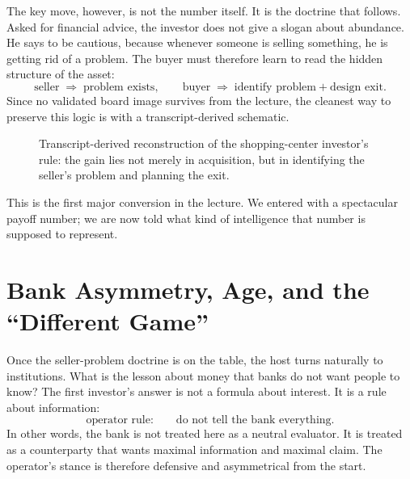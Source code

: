 The key move, however, is not the number itself. It is the doctrine that follows. Asked for financial advice, the investor does not give a slogan about abundance. He says to be cautious, because whenever someone is selling something, he is getting rid of a problem. The buyer must therefore learn to read the hidden structure of the asset:
\begin{equation}
\text{seller} \;\Rightarrow\; \text{problem exists},\qquad
\text{buyer} \;\Rightarrow\; \text{identify problem} + \text{design exit}.
\end{equation}
Since no validated board image survives from the lecture, the cleanest way to preserve this logic is with a transcript-derived schematic.

\begin{figure}[h]
\centering
{}
\caption{Transcript-derived reconstruction of the shopping-center investor's rule: the gain lies not merely in acquisition, but in identifying the seller's problem and planning the exit.}
\end{figure}

This is the first major conversion in the lecture. We entered with a spectacular payoff number; we are now told what kind of intelligence that number is supposed to represent.

\section{Bank Asymmetry, Age, and the ``Different Game''}

Once the seller-problem doctrine is on the table, the host turns naturally to institutions. What is the lesson about money that banks do not want people to know? The first investor's answer is not a formula about interest. It is a rule about information:
\begin{equation}
\text{operator rule:}\qquad \text{do not tell the bank everything}.
\end{equation}
In other words, the bank is not treated here as a neutral evaluator. It is treated as a counterparty that wants maximal information and maximal claim. The operator's stance is therefore defensive and asymmetrical from the start.

